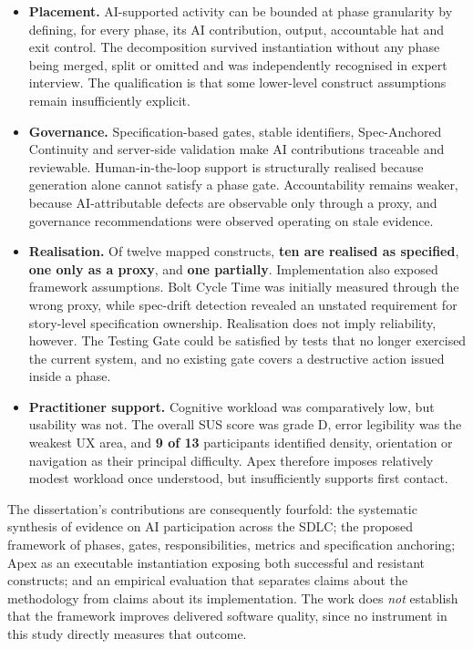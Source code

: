 \begin{itemize}[leftmargin=0.6cm, itemsep=0.35em, topsep=0.2em]

\item \textbf{Placement. } AI-supported activity can be bounded at phase granularity by defining, for every phase, its AI contribution, output, accountable hat and exit control. The decomposition survived instantiation without any phase being merged, split or omitted and was independently recognised in expert interview. The qualification is that some lower-level construct assumptions remain insufficiently explicit.

\item \textbf{Governance. } Specification-based gates, stable identifiers, Spec-Anchored Continuity and server-side validation make AI contributions traceable and reviewable. Human-in-the-loop support is structurally realised because generation alone cannot satisfy a phase gate. Accountability remains weaker, because AI-attributable defects are observable only through a proxy, and governance recommendations were observed operating on stale evidence.

\item \textbf{Realisation. } Of twelve mapped constructs, \textbf{ten are realised as specified}, \textbf{one only as a proxy}, and \textbf{one partially}. Implementation also exposed framework assumptions. Bolt Cycle Time was initially measured through the wrong proxy, while spec-drift detection revealed an unstated requirement for story-level specification ownership. Realisation does not imply reliability, however. The Testing Gate could be satisfied by tests that no longer exercised the current system, and no existing gate covers a destructive action issued inside a phase.

\item \textbf{Practitioner support. } Cognitive workload was comparatively low, but usability was not. The overall \ac{SUS} score was grade D, error legibility was the weakest \ac{UX} area, and \textbf{9 of 13} participants identified density, orientation or navigation as their principal difficulty. Apex therefore imposes relatively modest workload once understood, but insufficiently supports first contact.

\end{itemize}

The dissertation's contributions are consequently fourfold: the systematic synthesis of evidence on AI participation across the \ac{SDLC}; the proposed framework of phases, gates, responsibilities, metrics and specification anchoring; Apex as an executable instantiation exposing both successful and resistant constructs; and an empirical evaluation that separates claims about the methodology from claims about its implementation. The work does \emph{not} establish that the framework improves delivered software quality, since no instrument in this study directly measures that outcome.


